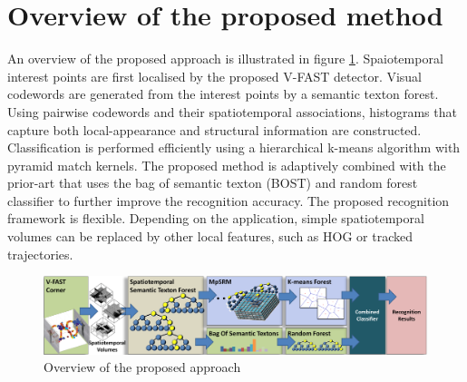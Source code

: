 \section{Overview of the proposed method}
\label{sec:overview}
An overview of the proposed approach is illustrated in figure \ref{img:flow}. Spaiotemporal interest points are first localised by the proposed V-FAST detector. Visual codewords are generated from the interest points by a semantic texton forest. Using pairwise codewords and their spatiotemporal associations, histograms that capture both local-appearance and structural information are constructed. Classification is performed efficiently using a hierarchical k-means algorithm with pyramid match kernels. The proposed method is adaptively combined with the prior-art that uses the bag of semantic texton (BOST) and random forest classifier to further improve the recognition accuracy.
The proposed recognition framework is flexible. Depending on the application, simple spatiotemporal volumes can be replaced by other local features, such as HOG or tracked trajectories.

\begin{figure}
\includegraphics[width=1.0\linewidth]{fig/actreg/fig1_new.pdf}%
\caption{Overview of the proposed approach}
\label{img:flow}
\end{figure}

